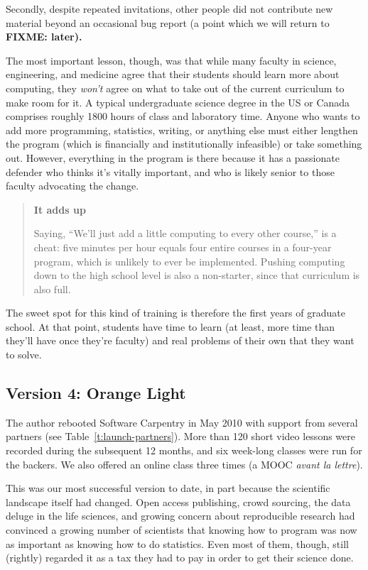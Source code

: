 \documentclass[10pt,a4paper,twocolumn]{article}
\newcommand{\fixme}[1]{\bf{FIXME: {#1}}}
\begin{document}
Secondly, despite repeated invitations, other people did not
contribute new material beyond an occasional bug report (a point which
we will return to \fixme{later}).

The most important lesson, though, was that while many faculty in
science, engineering, and medicine agree that their students should
learn more about computing, they \emph{won't} agree on what to take
out of the current curriculum to make room for it. A typical
undergraduate science degree in the US or Canada comprises roughly
1800 hours of class and laboratory time. Anyone who wants to add more
programming, statistics, writing, or anything else must either
lengthen the program (which is financially and institutionally
infeasible) or take something out. However, everything in the program
is there because it has a passionate defender who thinks it's vitally
important, and who is likely senior to those faculty advocating the
change.

\begin{quote}
\textbf{It adds up}

Saying, ``We'll just add a little computing to every other course,'' is
a cheat: five minutes per hour equals four entire courses in a four-year
program, which is unlikely to ever be implemented. Pushing computing
down to the high school level is also a non-starter, since that
curriculum is also full.
\end{quote}

The sweet spot for this kind of training is therefore the first years
of graduate school. At that point, students have time to learn (at
least, more time than they'll have once they're faculty) and real
problems of their own that they want to solve.

\subsection*{Version 4: Orange Light}

The author rebooted Software Carpentry in May 2010 with support from
several partners (see Table~\ref{t:launch-partners}). More than 120
short video lessons were recorded during the subsequent 12 months, and
six week-long classes were run for the backers. We also offered an
online class three times (a MOOC \emph{avant la lettre}).

This was our most successful version to date, in part because the
scientific landscape itself had changed. Open access publishing, crowd
sourcing, the data deluge in the life sciences, and growing concern
about reproducible research had convinced a growing number of
scientists that knowing how to program was now as important as knowing
how to do statistics.  Even most of them, though, still (rightly)
regarded it as a tax they had to pay in order to get their science
done.
\end{document}
